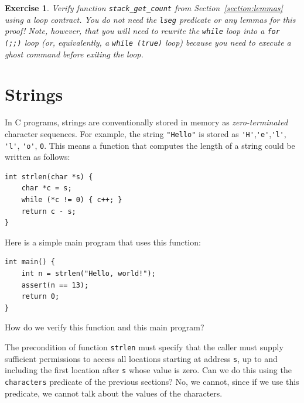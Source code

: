 \documentclass{article}
\newtheorem{exercise}{Exercise}
\begin{document}
\begin{exercise}\label{exercise:stack_tuerk}
Verify function \lstinline!stack_get_count! from Section~\ref{section:lemmas} using a loop contract. You do not need
the \lstinline!lseg! predicate or any lemmas for this proof! Note, however, that you will need to rewrite the \lstinline!while!
loop into a \lstinline!for (;;)! loop (or, equivalently, a \lstinline!while (true)! loop) because you need to execute a ghost
command before exiting the loop.
\end{exercise}

\section{Strings}\label{section:strings}

In C programs, strings are conventionally stored in memory as \emph{zero-terminated} character sequences. For example, the string
\lstinline!"Hello"! is stored as \lstinline!'H'!,\lstinline!'e'!,\lstinline!'l'!, \lstinline!'l'!, \lstinline!'o'!, \lstinline!0!. This means a function
that computes the length of a string could be written as follows:
\begin{lstlisting}
int strlen(char *s) {
    char *c = s;
    while (*c != 0) { c++; }
    return c - s;
}
\end{lstlisting}
Here is a simple main program that uses this function:
\begin{lstlisting}
int main() {
    int n = strlen("Hello, world!");
    assert(n == 13);
    return 0;
}
\end{lstlisting}

How do we verify this function and this main program?

The precondition of function \lstinline!strlen! must specify that the caller must supply sufficient permissions to access all locations starting at
address \lstinline!s!, up to and including the first location after \lstinline!s! whose value is zero. Can we do this using the \lstinline!characters!
predicate of the previous sections? No, we cannot, since if we use this predicate, we cannot talk about the values of the characters.
\end{document}
